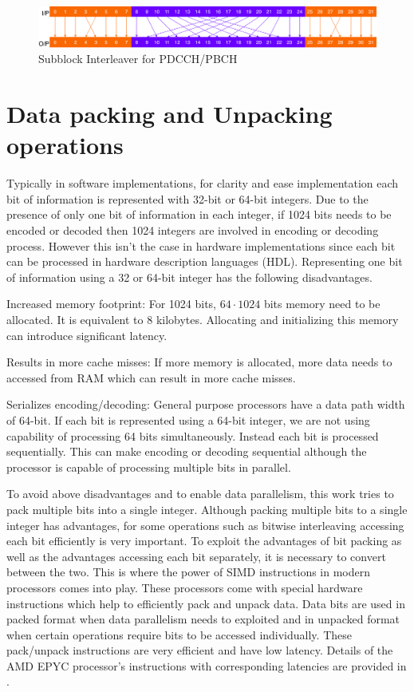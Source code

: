 \begin{figure}[h]
	\centering
	\includegraphics[width=1\textwidth]{./figures/subblockInterleaver.pdf}
	\caption{Subblock Interleaver for PDCCH/PBCH}
	\label{fig:subblockInterleaver}
\end{figure}

\section{Data packing and Unpacking operations} \label{dataPackUnpack}
Typically in software implementations, for clarity and ease implementation each bit of information is represented with 32-bit or 64-bit integers. Due to the presence of only one bit of information in each integer, if 1024 bits needs to be encoded or decoded then 1024 integers are involved in encoding or decoding process. However this isn't the case in hardware implementations since each bit can be processed in hardware description languages (HDL). Representing one bit of information using a 32 or 64-bit integer has the following disadvantages.

\begin{description}[font=$\bullet$~\normalfont]
	\item Increased memory footprint: For 1024 bits, $64\cdot1024$ bits memory need to be allocated. It is equivalent to 8 kilobytes. Allocating and initializing this memory can introduce significant latency.
	\item Results in more cache misses: If more memory is allocated, more data needs to accessed from RAM which can result in more cache misses.
	\item Serializes encoding/decoding: General purpose processors have a data path width of 64-bit. If each bit is represented using a 64-bit integer, we are not using capability of processing 64 bits simultaneously. Instead each bit is processed sequentially. This can make encoding or decoding sequential although the processor is capable of processing multiple bits in parallel.
\end{description}

To avoid above disadvantages and to enable data parallelism, this work tries to pack multiple bits into a single integer. Although packing multiple bits to a single integer has advantages, for some operations such as bitwise interleaving accessing each bit efficiently is very important. To exploit the advantages of bit packing as well as the advantages accessing each bit separately, it is necessary to convert between the two. This is where the power of SIMD instructions in modern processors comes into play. These processors come with special hardware instructions which help to efficiently pack and unpack data. Data bits are used in packed format when data parallelism needs to exploited and in unpacked format when certain operations require bits to be accessed individually. These pack/unpack instructions are very efficient and have low latency. Details of the AMD EPYC processor's instructions with corresponding latencies are provided in \cite{AgnerFog}.

